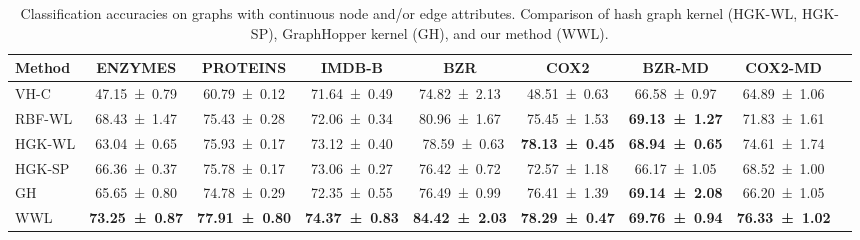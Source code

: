 \documentclass{article}
\begin{document}
\begin{table}[t]
\centering
\caption{Classification accuracies on graphs with continuous node and/or edge attributes. Comparison of hash graph kernel (HGK-WL, HGK-SP), GraphHopper kernel (GH), and our method (WWL).}
\label{results_cont}

  \renewrobustcmd{\boldmath}{}
\begin{sc}
 \setlength{\tabcolsep}{2.25pt}
 \fontsize{9}{10}\selectfont
    \begin{tabular}{lcccccccc}
        \toprule
        Method & ENZYMES           & PROTEINS         &  IMDB-B & BZR & COX2 & BZR-MD & COX2-MD\\
        \midrule
VH-C & \num{47.15 \pm 0.79}\phantom{} & \num{60.79 \pm 0.12}\phantom{} & \num{71.64 \pm 0.49}\phantom{} & \num{74.82 \pm 2.13}\phantom{} & \num{48.51 \pm 0.63} & \num{66.58 \pm 0.97} & \num{64.89 \pm 1.06}  \\
RBF-WL  & \num{68.43 \pm 1.47}\phantom{} & \num{75.43 \pm 0.28}\phantom{} & \num{72.06 \pm 0.34}\phantom{} & \num{80.96 \pm 1.67}\phantom{} &\num{75.45 \pm 1.53} &  \bfseries{\num{69.13 \pm 1.27}} & \num{71.83 \pm 1.61}\\
\midrule
HGK-WL  & \num{63.04 \pm 0.65}\phantom{} & \num{75.93 \pm 0.17}\phantom{} & \num{73.12 \pm 0.40}\phantom{} & \ \num{78.59 \pm 0.63}\phantom{} & \bfseries{\num{78.13 \pm 0.45}}  &   \bfseries{\num{68.94 \pm 0.65}} & \num{74.61 \pm 1.74} \\
HGK-SP  & \num{66.36 \pm 0.37}\phantom{} & \num{75.78 \pm 0.17}\phantom{} & \num{73.06 \pm 0.27}\phantom{} & \num{76.42 \pm 0.72}\phantom{} & \num{72.57 \pm 1.18}  & \num{66.17 \pm 1.05} & \num{68.52 \pm 1.00} \\
\midrule
GH      & \num{65.65\pm 0.80}\phantom{}  & \num{74.78\pm 0.29}\phantom{}  & \num{72.35 \pm 0.55}\phantom{} & \num{76.49 \pm 0.99}\phantom{} & \num{76.41 \pm 1.39} &  \bfseries{\num{69.14 \pm 2.08}} &  \num{66.20 \pm 1.05} \\
\midrule
WWL     & \bfseries\num{73.25\pm 0.87} & \bfseries\num{77.91 \pm  0.80}  & \bfseries\num{74.37 \pm 0.83} &  \bfseries\num{84.42 \pm 2.03} & \bfseries{\num{78.29 \pm 0.47}} & \bfseries{\num{69.76 \pm 0.94}} & \bfseries\num{76.33 \pm 1.02} \\ 
        \bottomrule
    \end{tabular}
\end{sc}
\end{table}
\end{document}
